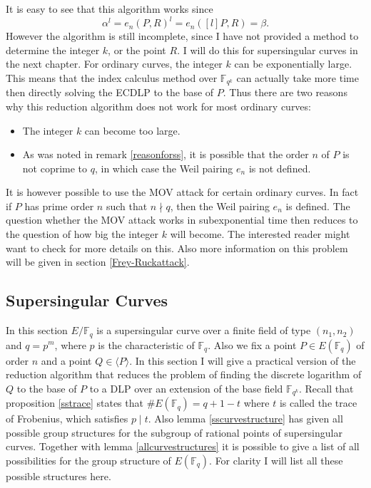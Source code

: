 \documentclass{article}
\numberwithin{equation}{section}
\theoremstyle{definition}
\newcommand{\FF}[1]{{\mathbb F}_{#1}} %
\newcommand{\grgen}[1]{\langle #1 \rangle} %
\begin{document}
It is easy to see that this algorithm works since $$\alpha^l = e_n(P,R)^l = e_n([l]P,R) = \beta.$$ However the algorithm is still incomplete, since I have not provided a method to determine the integer $k$, or the point $R$. I will do this for supersingular curves in the next chapter. For ordinary curves, the integer $k$ can be exponentially large. This means that the index calculus method over $\FF{q^k}$ can actually take more time then directly solving the ECDLP to the base of $P$. Thus there are two reasons why this reduction algorithm does not work for most ordinary curves:

\begin{itemize}
\item The integer $k$ can become too large.
\item As was noted in remark \ref{reasonforss}, it is possible that the order $n$ of $P$ is not coprime to $q$, in which case the Weil pairing $e_n$ is not defined.
\end{itemize}

It is however possible to use the MOV attack for certain ordinary curves. In fact if $P$ has prime order $n$ such that $n \nmid q$, then the Weil pairing $e_n$ is defined. The question whether the MOV attack works in subexponential time then reduces to the question of how big the integer $k$ will become. The interested reader might want to check \cite{FRdetails} for more details on this. Also more information on this problem will be given in section \ref{Frey-Ruckattack}.





\subsection{Supersingular Curves}
In this section $E/\FF{q}$ is a supersingular curve over a finite field of type $(n_1,n_2)$ and $q=p^m$, where $p$ is the characteristic of $\FF{q}$. Also we fix a point $P \in E(\FF{q})$ of order $n$ and a point $Q \in \grgen{P}$. In this section I will give a practical version of the reduction algorithm that reduces the problem of finding the discrete logarithm of $Q$ to the base of $P$ to a DLP over an extension of the base field $\FF{q^k}$. Recall that proposition \ref{sstrace} states that $\#E(\FF{q})=q+1-t$ where $t$ is called the trace of Frobenius, which satisfies $p\mid t$. Also lemma \ref{sscurvestructure} has given all possible group structures for the subgroup of rational points of supersingular curves. Together with lemma \ref{allcurvestructures} it is possible to give a list of all possibilities for the group structure of $E(\FF{q})$. For clarity I will list all these possible structures here. 
\end{document}
